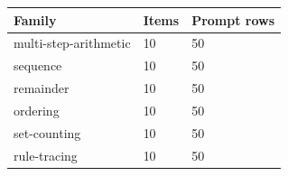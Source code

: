 \begin{center}\small\begin{tabular}{lll}\toprule
Family & Items & Prompt rows \\\midrule
multi-step-arithmetic & 10 & 50 \\
sequence & 10 & 50 \\
remainder & 10 & 50 \\
ordering & 10 & 50 \\
set-counting & 10 & 50 \\
rule-tracing & 10 & 50 \\
\bottomrule\end{tabular}\end{center}
